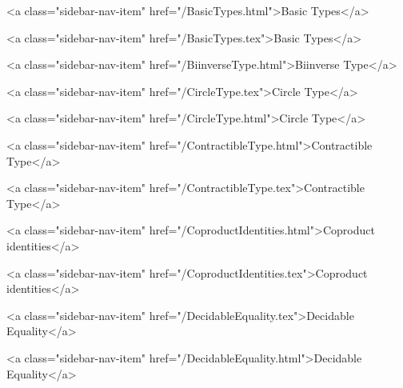       
        
          <a class="sidebar-nav-item" href="/BasicTypes.html">Basic Types</a>
        
      
    
      
        
          <a class="sidebar-nav-item" href="/BasicTypes.tex">Basic Types</a>
        
      
    
      
        
          <a class="sidebar-nav-item" href="/BiinverseType.html">Biinverse Type</a>
        
      
    
      
        
          <a class="sidebar-nav-item" href="/CircleType.tex">Circle Type</a>
        
      
    
      
        
          <a class="sidebar-nav-item" href="/CircleType.html">Circle Type</a>
        
      
    
      
        
          <a class="sidebar-nav-item" href="/ContractibleType.html">Contractible Type</a>
        
      
    
      
        
          <a class="sidebar-nav-item" href="/ContractibleType.tex">Contractible Type</a>
        
      
    
      
        
          <a class="sidebar-nav-item" href="/CoproductIdentities.html">Coproduct identities</a>
        
      
    
      
        
          <a class="sidebar-nav-item" href="/CoproductIdentities.tex">Coproduct identities</a>
        
      
    
      
        
          <a class="sidebar-nav-item" href="/DecidableEquality.tex">Decidable Equality</a>
        
      
    
      
        
          <a class="sidebar-nav-item" href="/DecidableEquality.html">Decidable Equality</a>
        
